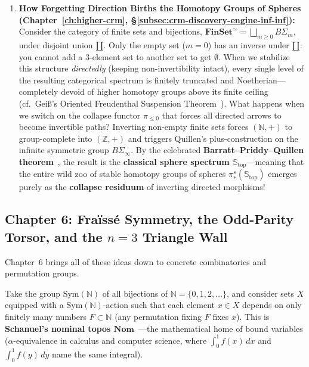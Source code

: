 \documentclass[10pt,twoside,openright]{book}
\theoremstyle{crmplain}
\theoremstyle{crmdef}
\theoremstyle{crmremark}
\begin{document}
\begin{enumerate}
  \item \textbf{How Forgetting Direction Births the Homotopy Groups of Spheres (Chapter~\ref{ch:higher-crm}, \S\ref{subsec:crm-discovery-engine-inf-inf}):} Consider the category of finite sets and bijections, $\mathbf{FinSet}^{\simeq} = \bigsqcup_{m \ge 0} B\Sigma_m$, under disjoint union $\amalg$. Only the empty set ($m = 0$) has an inverse under $\amalg$: you cannot add a $3$-element set to another set to get $\emptyset$. When we stabilize this structure \emph{directedly} (keeping non-invertibility intact), every single level of the resulting categorical spectrum is finitely truncated and Noetherian---completely devoid of higher homotopy groups above its finite ceiling (cf.\ Gei\ss's Oriented Freudenthal Suspension Theorem~\cite{Geiss26}). What happens when we switch on the collapse functor $\pi_{\le 0}$ that forces all directed arrows to become invertible paths? Inverting non-empty finite sets forces $(\mathbb{N}, +)$ to group-complete into $(\mathbb{Z}, +)$ and triggers Quillen's plus-construction on the infinite symmetric group $B\Sigma_\infty$. By the celebrated \textbf{Barratt--Priddy--Quillen theorem}~\cite{BarrattPriddy72,Quillen71}, the result is the \textbf{classical sphere spectrum $\mathbb{S}_{\mathrm{top}}$}---meaning that the entire wild zoo of stable homotopy groups of spheres $\pi_*^s(\mathbb{S}_{\mathrm{top}})$ emerges purely as the \textbf{collapse residuum} of inverting directed morphisms!
\end{enumerate}

\subsection*{Chapter 6: Fra\"iss\'e Symmetry, the Odd-Parity Torsor, and the $n = 3$ Triangle Wall}

Chapter~6 brings all of these ideas down to concrete combinatorics and permutation groups.

Take the group $\mathrm{Sym}(\mathbb{N})$ of all bijections of $\mathbb{N} = \{0, 1, 2, \dots\}$, and consider sets $X$ equipped with a $\mathrm{Sym}(\mathbb{N})$-action such that each element $x \in X$ depends on only finitely many numbers $F \subset \mathbb{N}$ (any permutation fixing $F$ fixes $x$). This is \textbf{Schanuel's nominal topos $\mathbf{Nom}$}~\cite[Ch.~III, \S 9]{MacLaneMoerdijk92}---the mathematical home of bound variables ($\alpha$-equivalence in calculus and computer science, where $\int_0^1 f(x)\,dx$ and $\int_0^1 f(y)\,dy$ name the same integral).
\end{document}
